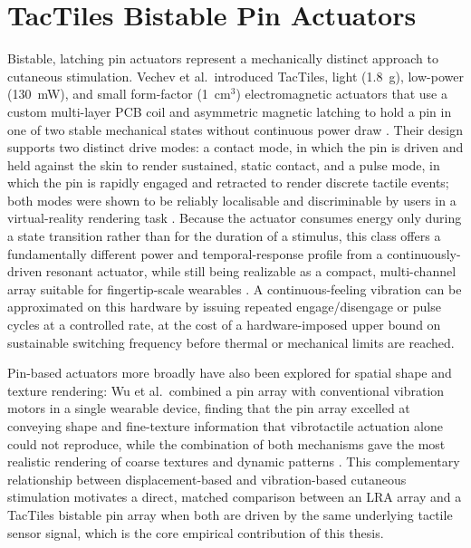 \documentclass[12pt, a4paper]{report}
\begin{document}
\section{TacTiles Bistable Pin Actuators}
Bistable, latching pin actuators represent a mechanically distinct approach to cutaneous stimulation. Vechev et al.\ introduced TacTiles, light (1.8~g), low-power (130~mW), and small form-factor (1~cm$^3$) electromagnetic actuators that use a custom multi-layer PCB coil and asymmetric magnetic latching to hold a pin in one of two stable mechanical states without continuous power draw \cite{vechev2019}. Their design supports two distinct drive modes: a contact mode, in which the pin is driven and held against the skin to render sustained, static contact, and a pulse mode, in which the pin is rapidly engaged and retracted to render discrete tactile events; both modes were shown to be reliably localisable and discriminable by users in a virtual-reality rendering task \cite{vechev2019}. Because the actuator consumes energy only during a state transition rather than for the duration of a stimulus, this class offers a fundamentally different power and temporal-response profile from a continuously-driven resonant actuator, while still being realizable as a compact, multi-channel array suitable for fingertip-scale wearables \cite{vechev2019}. A continuous-feeling vibration can be approximated on this hardware by issuing repeated engage/disengage or pulse cycles at a controlled rate, at the cost of a hardware-imposed upper bound on sustainable switching frequency before thermal or mechanical limits are reached.

Pin-based actuators more broadly have also been explored for spatial shape and texture rendering: Wu et al.\ combined a pin array with conventional vibration motors in a single wearable device, finding that the pin array excelled at conveying shape and fine-texture information that vibrotactile actuation alone could not reproduce, while the combination of both mechanisms gave the most realistic rendering of coarse textures and dynamic patterns \cite{vipins2025}. This complementary relationship between displacement-based and vibration-based cutaneous stimulation motivates a direct, matched comparison between an LRA array and a TacTiles bistable pin array when both are driven by the same underlying tactile sensor signal, which is the core empirical contribution of this thesis.
\end{document}
